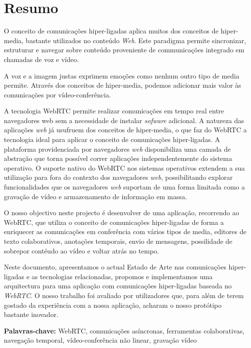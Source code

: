 \chapter*{Resumo}


O conceito de comunicações hiper-ligadas aplica muitos dos conceitos de hiper-media, bastante utilizados no conteúdo \emph{Web}. Este paradigma permite sincronizar, estruturar e navegar sobre conteúdo proveniente de communicações integrado em chamadas de voz e vídeo.


A voz e a imagem justas exprimem emoções como nenhum outro tipo de media permite. Através dos conceitos de hiper-media, podemos adicionar mais valor às comunicações por vídeo-conferência.

A tecnologia \ac{WebRTC} permite realizar comunicações em tempo real entre navegadores web sem a necessidade de instalar \emph{sofware} adicional. A natureza das aplicações \emph{web} já usufruem dos conceitos de hiper-media, o que faz do \ac{WebRTC} a tecnologia ideal para aplicar o conceito de comunicações hiper-ligadas.
A plataforma providenciada por navegadores \emph{web} disponibiliza uma camada de abstração que torna possível correr aplicações independentemente do sistema operativo.
O suporte nativo do \ac{WebRTC} nos sistemas operativos extendem a sua utilização para fora do contexto dos navegadores \emph{web}, possibilitando explorar funcionalidades que os navegadores \emph{web} suportam de uma forma limitada como a gravação de vídeo e armazenamento de informação em massa.

O nosso objectivo neste projecto é desenvolver de uma aplicação, recorrendo ao \ac{WebRTC}, que utiliza o conceito de comunicações hiper-ligadas de forma a enriquecer as comunicações em conferência com vários tipos de media, editores de texto colaborativos, anotações temporais, envio de mensagens, possilidade de sobrepor contéudo ao vídeo e voltar atrás no tempo.


Neste documento, apresentamos o actual Estado de Arte nas comunicações hiper-ligadas e as tecnologias relacionadas, propomos e implementamos uma arquitectura para uma aplicação com comunicações hiper-ligadas baseada no \emph{WebRTC}. O nosso trabalho foi avaliado por utilizadores que, para além de terem gostado da experiência com a nossa aplicação, acharam o nosso protótipo bastante inovador.

\vspace{1cm}

\textbf{\Large Palavras-chave:} WebRTC, comunicações asíncronas, ferramentas colaborativas, navegação temporal, vídeo-conferência não linear, gravação vídeo


\cleardoublepage
